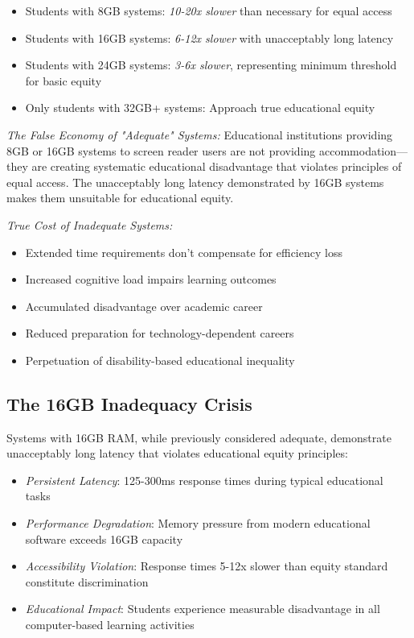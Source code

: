 \begin{itemize}
\item Students with 8GB systems: \emph{10-20x slower} than necessary for equal access
\item Students with 16GB systems: \emph{6-12x slower} with unacceptably long latency
\item Students with 24GB systems: \emph{3-6x slower}, representing minimum threshold for basic equity
\item Only students with 32GB+ systems: Approach true educational equity
\end{itemize}

\emph{The False Economy of "Adequate" Systems:}
Educational institutions providing 8GB or 16GB systems to screen reader users are not providing accommodation—they are creating systematic educational disadvantage that violates principles of equal access. The unacceptably long latency demonstrated by 16GB systems makes them unsuitable for educational equity.

\emph{True Cost of Inadequate Systems:}

\begin{itemize}
\item Extended time requirements don't compensate for efficiency loss
\item Increased cognitive load impairs learning outcomes
\item Accumulated disadvantage over academic career
\item Reduced preparation for technology-dependent careers
\item Perpetuation of disability-based educational inequality
\end{itemize}

\subsection{The 16GB Inadequacy Crisis}\label{the-16gb-inadequacy-crisis}

Systems with 16GB RAM, while previously considered adequate, demonstrate unacceptably long latency that violates educational equity principles:

\begin{itemize}
\item \emph{Persistent Latency}: 125-300ms response times during typical educational tasks
\item \emph{Performance Degradation}: Memory pressure from modern educational software exceeds 16GB capacity
\item \emph{Accessibility Violation}: Response times 5-12x slower than equity standard constitute discrimination
\item \emph{Educational Impact}: Students experience measurable disadvantage in all computer-based learning activities
\end{itemize}

